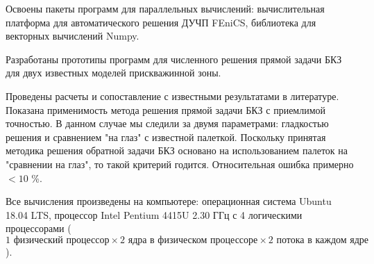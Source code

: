 
Освоены пакеты программ для параллельных вычислений: вычислительная платформа для автоматического решения ДУЧП FEniCS, библиотека для векторных вычислений Numpy.

Разработаны прототипы программ для численного решения прямой задачи БКЗ для двух известных моделей прискважинной зоны.

Проведены расчеты и сопоставление с известными результатами в литературе. Показана применимость метода решения прямой задачи БКЗ с приемлимой точностью. В данном случае мы следили за двумя параметрами: гладкостью решения и сравнением "на глаз" с известной палеткой. Поскольку принятая методика решения обратной задачи БКЗ основано на использованием палеток на "сравнении на глаз", то такой критерий годится. Относительная ошибка примерно ${<10}$ \%.

Все вычисления произведены на компьютере: операционная система Ubuntu 18.04 LTS, процессор Intel Pentium 4415U 2.30 ГГц с 4 логическими процессорами
($1 \text{ физический процессор} \times 2 \text{ ядра в физическом процессоре} \times 2 \text{ потока в каждом ядре}$).

\clearpage
